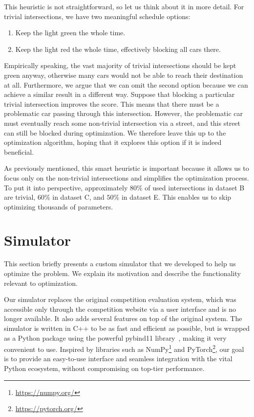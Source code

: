 This heuristic is not straightforward, so let us think about it in more detail. For trivial intersections, we have two meaningful schedule options:
\begin{enumerate}
    \item Keep the light green the whole time.
    \item Keep the light red the whole time, effectively blocking all cars there.
\end{enumerate}
Empirically speaking, the vast majority of trivial intersections should be kept green anyway, otherwise many cars would not be able to reach their destination at all.
Furthermore, we argue that we can omit the second option because we can achieve a similar result in a different way. Suppose that blocking a particular trivial intersection improves the score. This means that there must be a problematic car passing through this intersection. However, the problematic car must eventually reach some non-trivial intersection via a street, and this street can still be blocked during optimization. We therefore leave this up to the optimization algorithm, hoping that it explores this option if it is indeed beneficial.

As previously mentioned, this smart heuristic is important because it allows us to focus only on the non-trivial intersections and simplifies the optimization process. To put it into perspective, approximately $80 \%$ of used intersections in dataset B are trivial, $60 \%$ in dataset C, and $50 \%$ in dataset E. This enables us to skip optimizing thousands of parameters.

\section{Simulator} \label{sec:simulator}

This section briefly presents a custom simulator that we developed to help us optimize the problem. We explain its motivation and describe the functionality relevant to optimization.

\bigskip

Our simulator replaces the original competition evaluation system, which was accessible only through the competition website via a user interface and is no longer available. It also adds several features on top of the original system.
The simulator is written in C++ to be as fast and efficient as possible, but is wrapped as a Python package using the powerful pybind11 library~\cite{jakob2017pybind11}, making it very convenient to use.
Inspired by libraries such as NumPy\footnote{\url{https://numpy.org/}} and PyTorch\footnote{\url{https://pytorch.org/}}, our goal is to provide an easy-to-use interface and seamless integration with the vital Python ecosystem, without compromising on top-tier performance.

